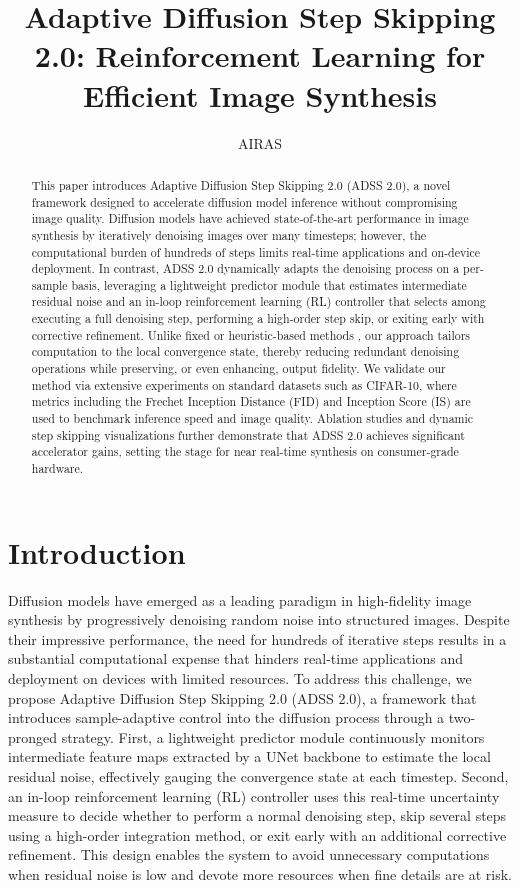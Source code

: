 \documentclass{article} %
\title{Adaptive Diffusion Step Skipping 2.0: Reinforcement Learning for Efficient Image Synthesis}
\author{AIRAS}
\begin{document}
\maketitle

\begin{abstract}
This paper introduces Adaptive Diffusion Step Skipping 2.0 (ADSS 2.0), a novel framework designed to accelerate diffusion model inference without compromising image quality. Diffusion models have achieved state‐of‐the‐art performance in image synthesis by iteratively denoising images over many timesteps; however, the computational burden of hundreds of steps limits real‐time applications and on-device deployment. In contrast, ADSS 2.0 dynamically adapts the denoising process on a per-sample basis, leveraging a lightweight predictor module that estimates intermediate residual noise and an in-loop reinforcement learning (RL) controller that selects among executing a full denoising step, performing a high-order step skip, or exiting early with corrective refinement. Unlike fixed or heuristic-based methods \cite{li2023faster,moon2024simple}, our approach tailors computation to the local convergence state, thereby reducing redundant denoising operations while preserving, or even enhancing, output fidelity. We validate our method via extensive experiments on standard datasets such as CIFAR-10, where metrics including the Frechet Inception Distance (FID) and Inception Score (IS) are used to benchmark inference speed and image quality. Ablation studies and dynamic step skipping visualizations further demonstrate that ADSS 2.0 achieves significant accelerator gains, setting the stage for near real-time synthesis on consumer-grade hardware.
\end{abstract}

\section{Introduction}
\label{sec:intro}
Diffusion models have emerged as a leading paradigm in high-fidelity image synthesis by progressively denoising random noise into structured images. Despite their impressive performance, the need for hundreds of iterative steps results in a substantial computational expense that hinders real-time applications and deployment on devices with limited resources. To address this challenge, we propose Adaptive Diffusion Step Skipping 2.0 (ADSS 2.0), a framework that introduces sample-adaptive control into the diffusion process through a two-pronged strategy. First, a lightweight predictor module continuously monitors intermediate feature maps extracted by a UNet backbone to estimate the local residual noise, effectively gauging the convergence state at each timestep. Second, an in-loop reinforcement learning (RL) controller uses this real-time uncertainty measure to decide whether to perform a normal denoising step, skip several steps using a high-order integration method, or exit early with an additional corrective refinement. This design enables the system to avoid unnecessary computations when residual noise is low and devote more resources when fine details are at risk.
\end{document}

